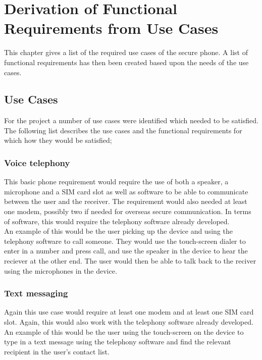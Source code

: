 \chapter{Derivation of Functional Requirements from Use Cases} %

\label{Chapter3} %

This chapter gives a list of the required use cases of the secure phone. A list of functional requirements has then been created based upon the needs of the use cases. 

\section{Use Cases}

	For the project a number of use cases were identified which needed to be satisfied. The following list describes the use cases and the functional requirements for which how they would be satisfied;

\subsection{Voice telephony}
	This basic phone requirement would require the use of both a speaker, a microphone and a SIM card slot as well as software to be able to communicate between the user and the receiver. The requirement would also needed at least one modem, possibly two if needed for overseas secure communication. In terms of software, this would require the telephony software already developed.\\
	An example of this would be the user picking up the device and using the telephony software to call someone. They would use the touch-screen dialer to enter in a number and press call, and use the speaker in the device to hear the reciever at the other end. The user would then be able to talk back to the reciver using the microphones in the device.

\subsection{Text messaging}
	Again this use case would require at least one modem and at least one SIM card slot. Again, this would also work with the telephony software already developed.\\
	An example of this would be the user using the touch-screen on the device to type in a text message using the telephony software and find the relevant recipient in the user's contact list.

